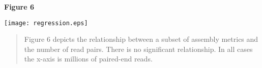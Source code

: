 \documentclass[10pt,letterpaper]{article}
\begin{document}
\textbf{\hypertarget{Figure 6}{Figure 6}} \\
\centerline{\texttt{[image: regression.eps]}}
\begin{quote}
\small{Figure 6 depicts the relationship between a subset of assembly metrics and the number of read pairs. There is no significant relationship. In all cases the x-axis is millions of paired-end reads. }
\end{quote}







\end{document}
